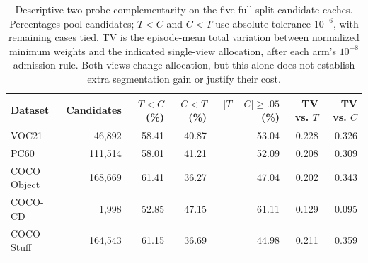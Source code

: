 \begin{table}[t]
\caption{Descriptive two-probe complementarity on the five full-split candidate caches. Percentages pool candidates; $T<C$ and $C<T$ use absolute tolerance $10^{-6}$, with remaining cases tied. TV is the episode-mean total variation between normalized minimum weights and the indicated single-view allocation, after each arm's $10^{-8}$ admission rule. Both views change allocation, but this alone does not establish extra segmentation gain or justify their cost.}
\label{tab:probe-complementarity}
\centering\small
\begin{tabular}{@{}lrrrrrr@{}}
\toprule
Dataset & Candidates & $T<C$ (\%) & $C<T$ (\%) & $|T-C|\geq.05$ (\%) & TV vs. $T$ & TV vs. $C$ \\
\midrule
VOC21 & 46,892 & 58.41 & 40.87 & 53.04 & 0.228 & 0.326 \\
PC60 & 111,514 & 58.01 & 41.21 & 52.09 & 0.208 & 0.309 \\
COCO Object & 168,669 & 61.41 & 36.27 & 47.04 & 0.202 & 0.343 \\
COCO-CD & 1,998 & 52.85 & 47.15 & 61.11 & 0.129 & 0.095 \\
COCO-Stuff & 164,543 & 61.15 & 36.69 & 44.98 & 0.211 & 0.359 \\
\bottomrule
\end{tabular}
\end{table}
